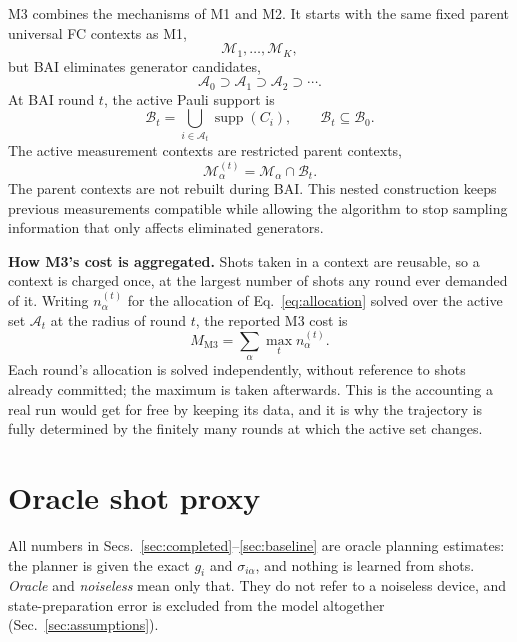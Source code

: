 \documentclass[10pt]{article}
\newcommand{\supp}{\operatorname{supp}}
\begin{document}
M3 combines the mechanisms of M1 and M2. It starts with the same fixed parent universal FC contexts as M1,
\begin{equation}
  \mathcal M_1,\ldots,\mathcal M_K,
\end{equation}
but BAI eliminates generator candidates,
\begin{equation}
  \mathcal A_0 \supset \mathcal A_1 \supset \mathcal A_2 \supset \cdots .
\end{equation}
At BAI round $t$, the active Pauli support is
\begin{equation}
  \mathcal B_t=\bigcup_{i\in\mathcal A_t}\supp(C_i),
  \qquad
  \mathcal B_t\subseteq\mathcal B_0 .
\end{equation}
The active measurement contexts are restricted parent contexts,
\begin{equation}
  \mathcal M_\alpha^{(t)}=\mathcal M_\alpha\cap\mathcal B_t .
\end{equation}
The parent contexts are not rebuilt during BAI. This nested construction keeps previous measurements compatible while allowing the algorithm to stop sampling information that only affects eliminated generators.

\textbf{How M3's cost is aggregated.} Shots taken in a context are reusable, so a context is charged once, at the largest number of shots any round ever demanded of it. Writing $n_\alpha^{(t)}$ for the allocation of Eq.~\eqref{eq:allocation} solved over the active set $\mathcal A_t$ at the radius of round $t$, the reported M3 cost is
\begin{equation}
  M_{\mathrm{M3}}=\sum_{\alpha}\max_{t} n_\alpha^{(t)} .
  \label{eq:m3-aggregate}
\end{equation}
Each round's allocation is solved independently, without reference to shots already committed; the maximum is taken afterwards. This is the accounting a real run would get for free by keeping its data, and it is why the trajectory is fully determined by the finitely many rounds at which the active set changes.

\section{Oracle shot proxy}
\label{sec:proxy}

All numbers in Secs.~\ref{sec:completed}--\ref{sec:baseline} are oracle planning estimates: the planner is given the exact $g_i$ and $\sigma_{i\alpha}$, and nothing is learned from shots. \emph{Oracle} and \emph{noiseless} mean only that. They do not refer to a noiseless device, and state-preparation error is excluded from the model altogether (Sec.~\ref{sec:assumptions}).
\end{document}
